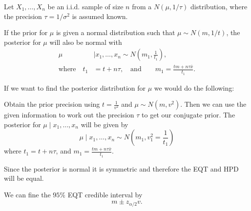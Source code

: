 \documentclass[10pt, a4paper]{article}
\begin{document}
Let $X_1, \dotsc, X_n$ be an i.i.d. sample of size $n$ from a $N(\mu, 1 / \tau)$ distribution,
where the precision $\tau = 1 / \sigma ^ 2$ is assumed known.

If the prior for $\mu$ is given a normal distribution such that $\mu \sim N(m, 1 / t)$,
the posterior for $\mu$ will also be normal with
\begin{align*}
    \mu&\mid x_1, \dotsc, x_n \sim N\left(m_1, \frac{1}{t_1}\right), \\
    \text{where}\quad t_1 &= t + n\tau,\quad\text{and}\qquad m_1 = \frac{tm + n\tau\bar{x}}{t_1}.
\end{align*}

If we want to find the posterior distribution for $\mu$ we would do the following:

Obtain the prior precision using $t = \frac{1}{v ^ 2}$ and $\mu \sim N(m, v ^ 2)$.
Then we can use the given information to work out the precision $\tau$ to get our conjugate prior.
The posterior for $\mu\mid x_1, \dotsc, x_n$ will be given by
\[
\mu\mid x_1, \dotsc, x_n \sim N\left(m_1, v_1 ^ 2 = \frac{1}{t_1}\right)
\]
where $t_1 = t + n\tau$,
and $m_1 = \frac{tm + n\tau\bar{x}}{t_1}$.

Since the posterior is normal it is symmetric and therefore the EQT and HPD will be equal.

We can fine the $95\%$ EQT credible interval by
\[
m \pm z_{\alpha / 2}v.
\]
\end{document}
